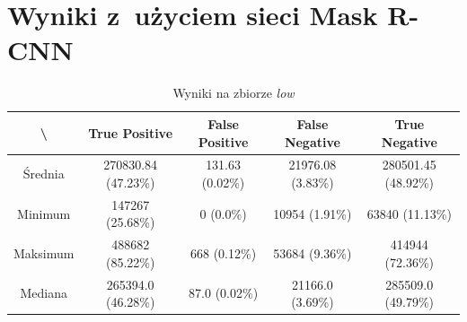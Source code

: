 \newpage
\section{Wyniki z~użyciem sieci Mask R-CNN}

\begin{table}[!h]
	\centering
	\caption{Wyniki na zbiorze \textit{low}}
	\vspace{6pt}
	{\footnotesize
		\begin{tabular}{|c|c|c|c|c|}
			\hline \textbackslash & True Positive & False Positive & False Negative & True Negative \\
      \hline Średnia & 270830.84 (47.23\%) & 131.63 (0.02\%) & 21976.08 (3.83\%) & 280501.45 (48.92\%) \\
      \hline Minimum & 147267 (25.68\%) & 0 (0.0\%) & 10954 (1.91\%) & 63840 (11.13\%) \\
      \hline Maksimum & 488682 (85.22\%) & 668 (0.12\%) & 53684 (9.36\%) & 414944 (72.36\%) \\
      \hline Mediana & 265394.0 (46.28\%) & 87.0 (0.02\%) & 21166.0 (3.69\%) & 285509.0 (49.79\%) \\
      \hline
		\end{tabular}
	}
	\vspace{0pt}
\end{table}

\vspace{1cm}

